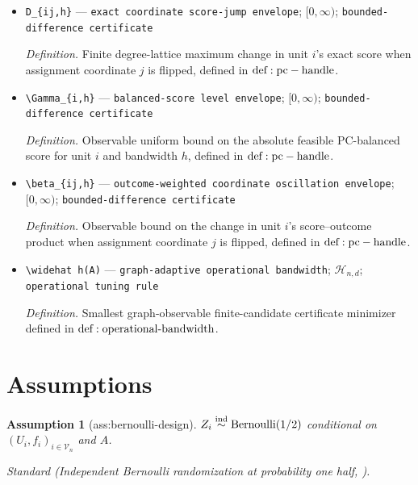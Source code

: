 \documentclass{article}
\newtheorem{assumption}{Assumption}
\begin{document}
\begin{itemize}
  \par\smallskip\noindent\emph{Definition.} Finite degree-lattice maximum of the absolute exact score for unit \(i\) and bandwidth \(h\), defined in \({\rm def:pc-handle}\).
  \item \texttt{D\_\allowbreak{}\{ij,\allowbreak{}h\}\allowbreak{}} --- \texttt{exact coordinate score-\allowbreak{}jump envelope}; \([0,\infty)\); \texttt{bounded-\allowbreak{}difference certificate}
  \par\smallskip\noindent\emph{Definition.} Finite degree-lattice maximum change in unit \(i\)'s exact score when assignment coordinate \(j\) is flipped, defined in \({\rm def:pc-handle}\).
  \item \texttt{\textbackslash{}\allowbreak{}Gamma\_\allowbreak{}\{i,\allowbreak{}h\}\allowbreak{}} --- \texttt{balanced-\allowbreak{}score level envelope}; \([0,\infty)\); \texttt{bounded-\allowbreak{}difference certificate}
  \par\smallskip\noindent\emph{Definition.} Observable uniform bound on the absolute feasible PC-balanced score for unit \(i\) and bandwidth \(h\), defined in \({\rm def:pc-handle}\).
  \item \texttt{\textbackslash{}\allowbreak{}beta\_\allowbreak{}\{ij,\allowbreak{}h\}\allowbreak{}} --- \texttt{outcome-\allowbreak{}weighted coordinate oscillation envelope}; \([0,\infty)\); \texttt{bounded-\allowbreak{}difference certificate}
  \par\smallskip\noindent\emph{Definition.} Observable bound on the change in unit \(i\)'s score--outcome product when assignment coordinate \(j\) is flipped, defined in \({\rm def:pc-handle}\).
  \item \texttt{\textbackslash{}\allowbreak{}widehat h(A)} --- \texttt{graph-\allowbreak{}adaptive operational bandwidth}; \(\mathcal H_{n,d}\); \texttt{operational tuning rule}
  \par\smallskip\noindent\emph{Definition.} Smallest graph-observable finite-candidate certificate minimizer defined in \({\rm def:operational\text{-}bandwidth}\).
\end{itemize}

\section{Assumptions}

\begin{assumption}[ass:bernoulli-design]\label{ass:bernoulli-design}
\(Z_i\overset{\mathrm{ind}}{\sim}{\rm Bernoulli}(1/2)\) conditional on \((U_i,f_i)_{i\in\mathcal V_n}\) and \(A\).
\par\smallskip\noindent\emph{Standard} (Independent Bernoulli randomization at probability one half, \cite{HuLiWager2022AverageDirectIndirect}).
\end{assumption}
\end{document}
